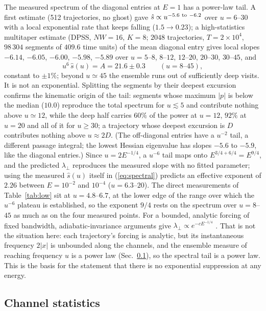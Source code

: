 \documentclass[11pt,a4paper]{article}
\begin{document}
The measured spectrum of the diagonal entries at $E=1$ has a power-law tail. A first estimate
(512 trajectories, no ghost) gave $\hat s\propto u^{-5.6\ {\rm to}\ -6.2}$ over $u=6$--$30$ with
a local exponential rate that keeps falling ($1.5\to0.23$); a high-statistics multitaper
estimate (DPSS, $NW=16$, $K=8$; $2048$ trajectories, $T=2\times10^4$, $98\,304$ segments of
$409.6$ time units) of the mean diagonal entry gives local slopes $-6.14$, $-6.05$, $-6.00$,
$-5.98$, $-5.89$ over $u=5$--$8$, $8$--$12$, $12$--$20$, $20$--$30$, $30$--$45$, and
\begin{equation}
u^6\,\hat s(u)=A=21.6\pm0.3\qquad(u=8\text{--}45),
\label{eq:A}
\end{equation}
constant to $\pm1\%$; beyond $u\simeq45$ the ensemble runs out of sufficiently deep visits. It
is not an exponential. Splitting the segments by their deepest excursion confirms the kinematic
origin of the tail: segments whose maximum $|p|$ is below the median ($10.0$) reproduce the total
spectrum for $u\lesssim5$ and contribute nothing above $u\simeq12$, while the deep half carries
$60\%$ of the power at $u=12$, $92\%$ at $u=20$ and all of it for $u\ge30$; a trajectory whose
deepest excursion is $D$ contributes nothing above $u\approx2D$. (The off-diagonal entries have
a $u^{-2}$ tail, a different passage integral; the lowest Hessian eigenvalue has slopes $-5.6$
to $-5.9$, like the diagonal entries.) Since $u=2E^{-1/4}$, a $u^{-6}$ tail maps onto
$E^{3/4+6/4}=E^{9/4}$, and the predicted $\lambda_\perp$ reproduces the measured slope with no
fitted parameter; using the measured $\hat s(u)$ itself in (\ref{eq:spectral}) predicts an
effective exponent of $2.26$ between $E=10^{-2}$ and $10^{-4}$ ($u=6.3$--$20$). The direct
measurements of Table~\ref{tab:low} sit at $u=4.8$--$6.7$, at the lower edge of the range over
which the $u^{-6}$ plateau is established, so the exponent $9/4$ rests on the spectrum over
$u=8$--$45$ as much as on the four measured points. For a bounded, analytic forcing of fixed
bandwidth, adiabatic-invariance arguments give $\lambda_\perp\propto e^{-cE^{-1/4}}$
\cite{Neishtadt}. That is not the situation here: each trajectory's forcing is analytic, but its
instantaneous frequency $2|x|$ is unbounded along the channels, and the ensemble measure of
reaching frequency $u$ is a power law (Sec.~\ref{sec:channels}), so the spectral tail is a power
law. This is the basis for the statement that there is no exponential suppression at any energy.

\subsection{Channel statistics}
\label{sec:channels}
\end{document}
